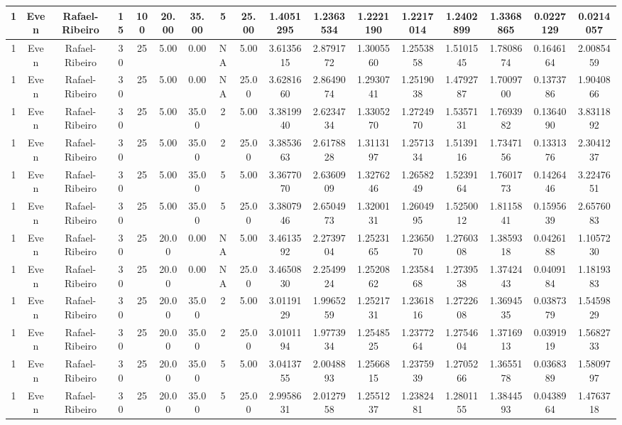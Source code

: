\documentclass[a4paper]{article}
\begin{document}
\begin{center}
\begin{tabular}{ | c | c | c | c | c | c | c | c | c | c | c | c | c | c | c | c | c | }
		\hline
		1	&	Even	&	Rafael-Ribeiro	&	15	&	100	&	20.00	&	35.00	&	5	&	25.00	&	1.4051295	&	1.2363534	&	1.2221190	&	1.2217014	&	1.2402899	&	1.3368865	&	0.0227129	&	0.0214057 \\
		\hline
		1	&	Even	&	Rafael-Ribeiro	&	30	&	25	&	5.00	&	0.00	&	NA	&	5.00	&	3.6135615	&	2.8791772	&	1.3005560	&	1.2553858	&	1.5101545	&	1.7808674	&	0.1646164	&	2.0085459 \\
		\hline
		1	&	Even	&	Rafael-Ribeiro	&	30	&	25	&	5.00	&	0.00	&	NA	&	25.00	&	3.6281660	&	2.8649074	&	1.2930741	&	1.2519038	&	1.4792787	&	1.7009700	&	0.1373786	&	1.9040866 \\
		\hline
		1	&	Even	&	Rafael-Ribeiro	&	30	&	25	&	5.00	&	35.00	&	2	&	5.00	&	3.3819940	&	2.6234734	&	1.3305270	&	1.2724970	&	1.5357131	&	1.7693982	&	0.1364090	&	3.8311892 \\
		\hline
		1	&	Even	&	Rafael-Ribeiro	&	30	&	25	&	5.00	&	35.00	&	2	&	25.00	&	3.3853663	&	2.6178828	&	1.3113197	&	1.2571334	&	1.5139116	&	1.7347156	&	0.1331376	&	2.3041237 \\
		\hline
		1	&	Even	&	Rafael-Ribeiro	&	30	&	25	&	5.00	&	35.00	&	5	&	5.00	&	3.3677070	&	2.6360909	&	1.3276246	&	1.2658249	&	1.5239164	&	1.7601773	&	0.1426446	&	3.2247651 \\
		\hline
		1	&	Even	&	Rafael-Ribeiro	&	30	&	25	&	5.00	&	35.00	&	5	&	25.00	&	3.3807946	&	2.6504973	&	1.3200131	&	1.2604995	&	1.5250012	&	1.8115841	&	0.1595639	&	2.6576083 \\
		\hline
		1	&	Even	&	Rafael-Ribeiro	&	30	&	25	&	20.00	&	0.00	&	NA	&	5.00	&	3.4613592	&	2.2739704	&	1.2523165	&	1.2365070	&	1.2760308	&	1.3859318	&	0.0426188	&	1.1057230 \\
		\hline
		1	&	Even	&	Rafael-Ribeiro	&	30	&	25	&	20.00	&	0.00	&	NA	&	25.00	&	3.4650830	&	2.2549924	&	1.2520862	&	1.2358468	&	1.2739538	&	1.3742443	&	0.0409184	&	1.1819383 \\
		\hline
		1	&	Even	&	Rafael-Ribeiro	&	30	&	25	&	20.00	&	35.00	&	2	&	5.00	&	3.0119129	&	1.9965259	&	1.2521731	&	1.2361816	&	1.2722608	&	1.3694535	&	0.0387379	&	1.5459829 \\
		\hline
		1	&	Even	&	Rafael-Ribeiro	&	30	&	25	&	20.00	&	35.00	&	2	&	25.00	&	3.0101194	&	1.9773934	&	1.2548525	&	1.2377264	&	1.2754604	&	1.3716913	&	0.0391919	&	1.5682733 \\
		\hline
		1	&	Even	&	Rafael-Ribeiro	&	30	&	25	&	20.00	&	35.00	&	5	&	5.00	&	3.0413755	&	2.0048893	&	1.2566815	&	1.2375939	&	1.2705266	&	1.3655178	&	0.0368389	&	1.5809797 \\
		\hline
		1	&	Even	&	Rafael-Ribeiro	&	30	&	25	&	20.00	&	35.00	&	5	&	25.00	&	2.9958631	&	2.0127958	&	1.2551237	&	1.2382481	&	1.2801155	&	1.3844593	&	0.0438964	&	1.4763718 \\

\end{tabular}
\end{center}
\end{document}
